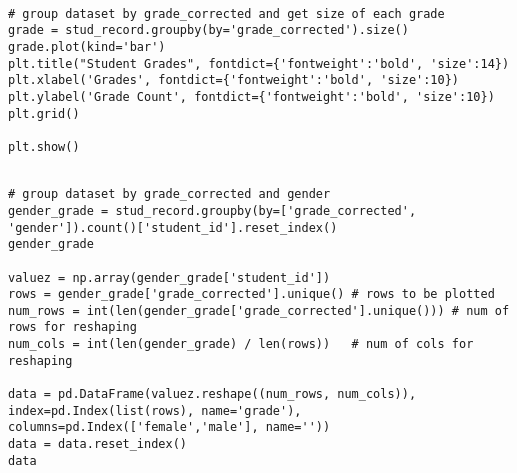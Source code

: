 \label{code:grade_dist}
\begin{verbatim}
	
# group dataset by grade_corrected and get size of each grade
grade = stud_record.groupby(by='grade_corrected').size()
grade.plot(kind='bar')
plt.title("Student Grades", fontdict={'fontweight':'bold', 'size':14})
plt.xlabel('Grades', fontdict={'fontweight':'bold', 'size':10})
plt.ylabel('Grade Count', fontdict={'fontweight':'bold', 'size':10})
plt.grid()

plt.show()
\end{verbatim}


\label{code:gender_grade}
\begin{verbatim}

# group dataset by grade_corrected and gender
gender_grade = stud_record.groupby(by=['grade_corrected', 'gender']).count()['student_id'].reset_index()
gender_grade

valuez = np.array(gender_grade['student_id'])
rows = gender_grade['grade_corrected'].unique() # rows to be plotted
num_rows = int(len(gender_grade['grade_corrected'].unique())) # num of rows for reshaping
num_cols = int(len(gender_grade) / len(rows))   # num of cols for reshaping

data = pd.DataFrame(valuez.reshape((num_rows, num_cols)),
index=pd.Index(list(rows), name='grade'),
columns=pd.Index(['female','male'], name=''))
data = data.reset_index()
data
\end{verbatim}


